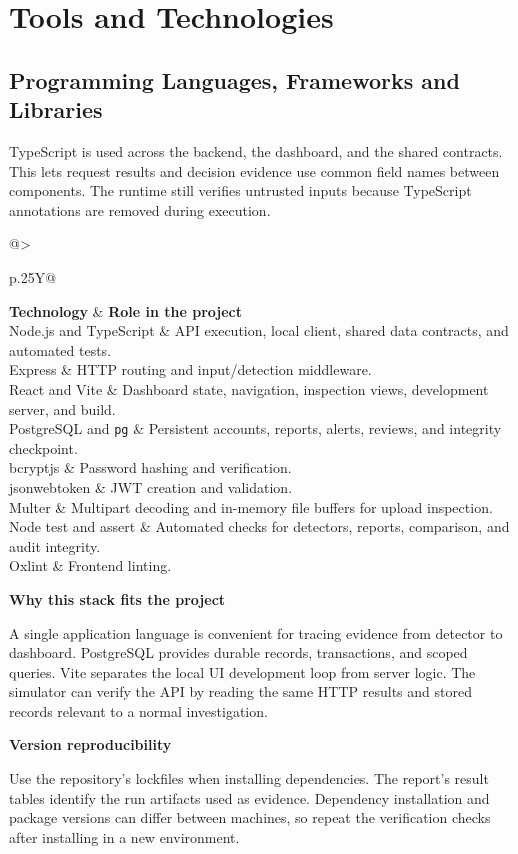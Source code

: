 \documentclass[11pt,letterpaper,oneside]{report}
\makeatletter
\newcommand{\topic}[1]{\smallskip\noindent\textbf{#1}\par\nobreak\vspace{-.39em}}
\newcommand{\casecode}[1]{\texttt{#1}}
\newcommand{\tabletitle}[1]{\captionof{table}{#1}\smallskip}
\newcommand{\bodytable}[1]{\begin{tabularx}{\linewidth}{@{}>{\raggedright\arraybackslash}p{.25\linewidth}Y@{}}\toprule #1\bottomrule\end{tabularx}}
\makeatother
\begin{document}
\chapter{Tools and Technologies}
\section{Programming Languages, Frameworks and Libraries}
TypeScript is used across the backend, the dashboard, and the shared contracts. This lets request results and decision evidence use common field names between components. The runtime still verifies untrusted inputs because TypeScript annotations are removed during execution.

\tabletitle{Technologies and their roles}
\bodytable{\textbf{Technology} & \textbf{Role in the project}\\\midrule
Node.js and TypeScript & API execution, local client, shared data contracts, and automated tests.\\
Express & HTTP routing and input/detection middleware.\\
React and Vite & Dashboard state, navigation, inspection views, development server, and build.\\
PostgreSQL and \casecode{pg} & Persistent accounts, reports, alerts, reviews, and integrity checkpoint.\\
bcryptjs & Password hashing and verification.\\
jsonwebtoken & JWT creation and validation.\\
Multer & Multipart decoding and in-memory file buffers for upload inspection.\\
Node test and assert & Automated checks for detectors, reports, comparison, and audit integrity.\\
Oxlint & Frontend linting.\\}

\topic{Why this stack fits the project}
A single application language is convenient for tracing evidence from detector to dashboard. PostgreSQL provides durable records, transactions, and scoped queries. Vite separates the local UI development loop from server logic. The simulator can verify the API by reading the same HTTP results and stored records relevant to a normal investigation.

\topic{Version reproducibility}
Use the repository's lockfiles when installing dependencies. The report's result tables identify the run artifacts used as evidence. Dependency installation and package versions can differ between machines, so repeat the verification checks after installing in a new environment.
\end{document}
